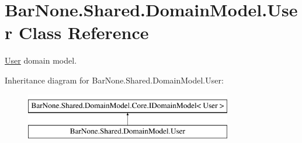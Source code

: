 \hypertarget{class_bar_none_1_1_shared_1_1_domain_model_1_1_user}{}\section{Bar\+None.\+Shared.\+Domain\+Model.\+User Class Reference}
\label{class_bar_none_1_1_shared_1_1_domain_model_1_1_user}


\mbox{\hyperlink{class_bar_none_1_1_shared_1_1_domain_model_1_1_user}{User}} domain model.  


Inheritance diagram for Bar\+None.\+Shared.\+Domain\+Model.\+User\+:\begin{figure}[H]
\begin{center}
\leavevmode
\includegraphics[height=2.000000cm]{class_bar_none_1_1_shared_1_1_domain_model_1_1_user}
\end{center}
\end{figure}
